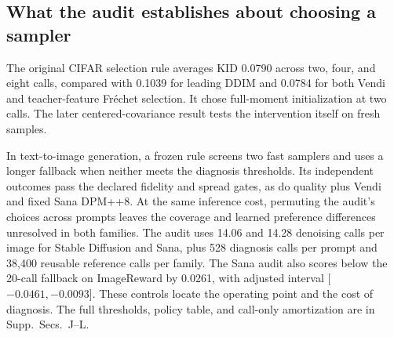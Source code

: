 \subsection{What the audit establishes about choosing a sampler}
\label{sec:policy}
The original CIFAR selection rule averages KID 0.0790 across two, four,
and eight calls, compared with 0.1039 for leading DDIM and 0.0784 for
both Vendi and teacher-feature Fr\'echet selection. It chose full-moment
initialization at two calls. The later centered-covariance result tests
the intervention itself on fresh samples.

In text-to-image generation, a frozen rule screens two fast samplers
and uses a longer fallback when neither meets the diagnosis thresholds.
Its independent outcomes pass the declared fidelity and spread gates,
as do quality plus Vendi and fixed Sana DPM++8. At the same inference
cost, permuting the audit's choices across prompts leaves the coverage
and learned preference differences unresolved in both families.
The audit uses 14.06 and 14.28 denoising calls per image for Stable
Diffusion and Sana, plus 528 diagnosis calls per prompt and 38,400
reusable reference calls per family. The Sana audit also scores below
the 20-call fallback on ImageReward by 0.0261, with adjusted interval
[$-0.0461,-0.0093$]. These controls locate the operating point and the
cost of diagnosis. The full thresholds, policy table, and call-only
amortization are in Supp.~Secs.~J--L.
